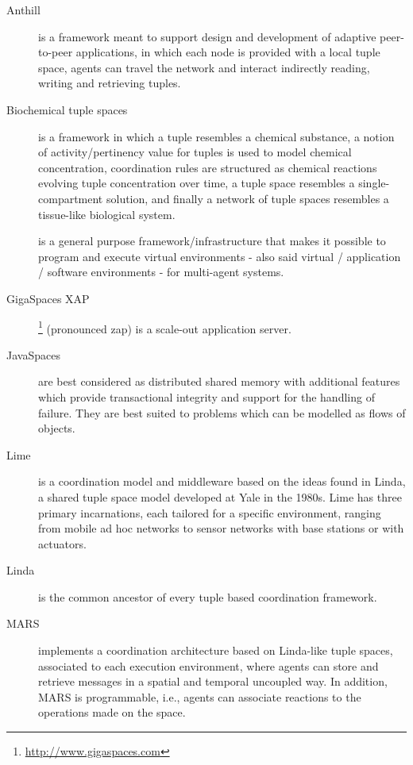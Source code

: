 \documentclass[12pt,a4paper,twoside,openright]{book}
\begin{document}
\begin{description}
 \item[Anthill] \cite{anthill} is a framework meant to support design and development of adaptive peer-to-peer applications, in which each node is provided with a local tuple space, agents can travel the network and interact indirectly reading, writing and retrieving tuples.

 \item[Biochemical tuple spaces] \cite{biochemicalTupleSpaces} is a framework in which a tuple resembles a chemical substance, a notion of activity/pertinency value for tuples is used to model chemical concentration, coordination rules are structured as chemical reactions evolving tuple concentration over time, a tuple space resembles a single-compartment solution, and finally a network of tuple spaces resembles a tissue-like biological system.

 \item[\cartago{}] \cite{RPV-JAAMAS2011} is a general purpose framework/infrastructure that makes it possible to program and execute virtual environments - also said virtual / application / software environments - for multi-agent systems.

 \item[GigaSpaces XAP]\footnote{\url{http://www.gigaspaces.com}} (pronounced zap) is a scale-out application server.

 \item[JavaSpaces] \cite{javaspaces1999,javaspaces} are best considered as distributed shared memory with additional features which provide transactional integrity and support for the handling of failure. They are best suited to problems which can be modelled as flows of objects.

 \item[Lime] \cite{murphy2006lime} is a coordination model and middleware based on the ideas found in Linda, a shared tuple space model developed at Yale in the 1980s. Lime has three primary incarnations, each tailored for a specific environment, ranging from mobile ad hoc networks to sensor networks with base stations or with actuators.

 \item[Linda] \cite{linda-toplas7} is the common ancestor of every tuple based coordination framework.

 \item[MARS] \cite{mars} implements a coordination architecture based on Linda-like tuple spaces, associated to each execution environment, where agents can store and retrieve messages in a spatial and temporal uncoupled way.
 In addition, MARS is programmable, i.e., agents can associate reactions to the operations made on the space.


\end{description}
\end{document}
